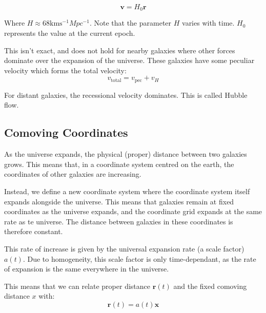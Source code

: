 \[
    \pmb{v} = H_0 \pmb{r}
\]

Where $H \approx 68 \si{\kilo\metre \s^{-1} Mpc^{-1}}$. Note that the parameter $H$ varies with time. $H_0$ represents the value at the current epoch.

This isn't exact, and does not hold for nearby galaxies where other forces dominate over the expansion of the universe. These galaxies have some peculiar velocity which forms the total velocity:
\[
    v_\text{total} = v_\text{pec} + v_H
\]

For distant galaxies, the recessional velocity dominates. This is called Hubble flow.

\subsection{Comoving Coordinates}
As the universe expands, the physical (proper) distance between two galaxies grows. This means that, in a coordinate system centred on the earth, the coordinates of other galaxies are increasing.

Instead, we define a new coordinate system where the coordinate system itself expands alongside the universe. This means that galaxies remain at fixed coordinates as the universe expands, and the coordinate grid expands at the same rate as te universe. The distance between galaxies in these coordinates is therefore constant.

This rate of increase is given by the universal expansion rate (a scale factor) $a(t)$. Due to homogeneity, this scale factor is only time-dependant, as the rate of expansion is the same everywhere in the universe.

This means that we can relate proper distance $\pmb{r}(t)$ and the fixed comoving distance $x$ with:
\[
    \pmb{r}(t) = a(t) \pmb{x}
\]

